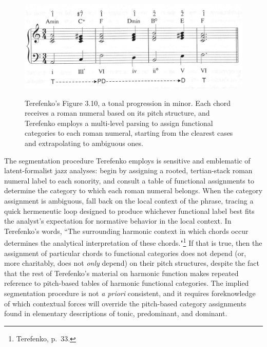 \begin{figure}
	\centering
	\caption{Terefenko's Figure 3.10, a tonal progression in minor.  Each chord receives a roman numeral based on its pitch structure, and Terefenko employs a multi-level parsing to assign functional categories to each roman numeral, starting from the clearest cases and extrapolating to ambiguous ones.}
	\includegraphics[width=5in]{Terefenko_ex.png}
	\label{Terefenko_ex}
\end{figure}

The segmentation procedure Terefenko employs is sensitive and emblematic of latent-formalist jazz analyses: begin by assigning a rooted, tertian-stack roman numeral label to each sonority, and consult a table of functional assignments to determine the category to which each roman numeral belongs.  When the category assignment is ambiguous, fall back on the local context of the phrase, tracing a quick hermeneutic loop designed to produce whichever functional label best fits the analyst's expectation for normative behavior in the local context.  In Terefenko's words, ``The surrounding harmonic context in which chords occur determines the analytical interpretation of these chords."\footnote{Terefenko, p.\ 33.}  If that is true, then the assignment of particular chords to functional categories does not depend (or, more charitably, does not \emph{only} depend) on their pitch structures, despite the fact that the rest of Terefenko's material on harmonic function makes repeated reference to pitch-based tables of harmonic functional categories.  The implied segmentation procedure is not \emph{a priori} consistent, and it requires foreknowledge of which contextual forces will override the pitch-based category assignments found in elementary descriptions of tonic, predominant, and dominant.

